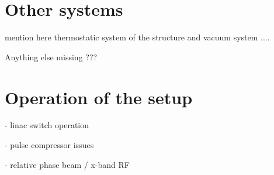 \section[Other systems]{Other systems}
mention here thermostatic system of the structure and vacuum system ....

Anything else missing ???

\section[Operation of the setup]{Operation of the setup}

- linac switch operation

- pulse compressor issues

- relative phase beam / x-band RF









